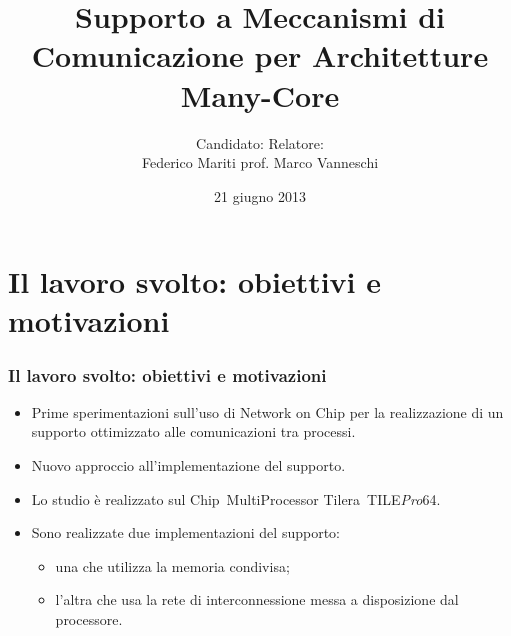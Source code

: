 \documentclass{beamer}
\title{Supporto a Meccanismi di Comunicazione per Architetture Many-Core}
\author[Federico Mariti]{{\small Candidato:}\hspace{18ex}  {\small Relatore:} \\ \hspace{3ex}Federico Mariti \hspace{8ex} prof. Marco Vanneschi}
\date{21 giugno 2013}
\newcommand{\tile}{TILE\textit{Pro}64}
\begin{document}
\maketitle

\section{Il lavoro svolto: obiettivi e motivazioni}

\begin{frame}
  \frametitle{Il lavoro svolto: obiettivi e motivazioni}
  \begin{itemize}
  \item Prime sperimentazioni sull'uso di Network on Chip per la realizzazione di un supporto ottimizzato alle comunicazioni tra processi.
  \item Nuovo approccio all'implementazione del supporto.
  \item Lo studio \`e realizzato sul Chip~MultiProcessor Tilera~\tile.
  \item Sono realizzate due implementazioni del supporto:
    \begin{itemize}
      \item una che utilizza la memoria condivisa;
      \item l'altra che usa la rete di interconnessione messa a disposizione dal processore.
    \end{itemize}
  \end{itemize}
\end{frame}
\end{document}
